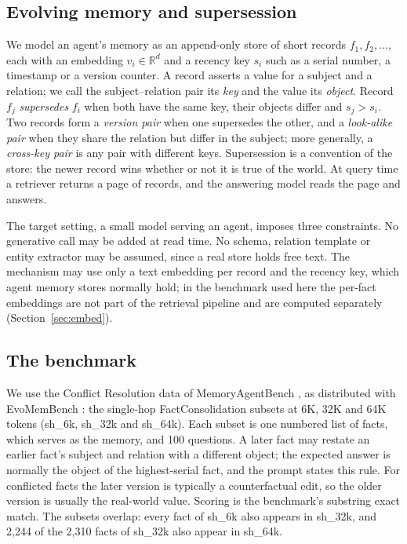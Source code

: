 \documentclass[11pt]{article}
\newcommand{\sub}[1]{\textsf{sh\_#1}}                    %
\begin{document}
\subsection{Evolving memory and supersession}
\label{sec:setting}

We model an agent's memory as an append-only store of short records $f_1,f_2,\dots$, each with an embedding $v_i\in\mathbb{R}^d$ and a recency key $s_i$ such as a serial number, a timestamp or a version counter. A record asserts a value for a subject and a relation; we call the subject--relation pair its \emph{key} and the value its \emph{object}. Record $f_j$ \emph{supersedes} $f_i$ when both have the same key, their objects differ and $s_j>s_i$. Two records form a \emph{version pair} when one supersedes the other, and a \emph{look-alike pair} when they share the relation but differ in the subject; more generally, a \emph{cross-key pair} is any pair with different keys. Supersession is a convention of the store: the newer record wins whether or not it is true of the world. At query time a retriever returns a page of records, and the answering model reads the page and answers.

The target setting, a small model serving an agent, imposes three constraints. No generative call may be added at read time. No schema, relation template or entity extractor may be assumed, since a real store holds free text. The mechanism may use only a text embedding per record and the recency key, which agent memory stores normally hold; in the benchmark used here the per-fact embeddings are not part of the retrieval pipeline and are computed separately (Section~\ref{sec:embed}).

\subsection{The benchmark}
\label{sec:benchmark}

We use the Conflict Resolution data of MemoryAgentBench \cite{hu2026memoryagentbench}, as distributed with EvoMemBench \cite{wang2026evomembench}: the single-hop FactConsolidation subsets at 6K, 32K and 64K tokens (\sub{6k}, \sub{32k} and \sub{64k}). Each subset is one numbered list of facts, which serves as the memory, and 100 questions. A later fact may restate an earlier fact's subject and relation with a different object; the expected answer is normally the object of the highest-serial fact, and the prompt states this rule. For conflicted facts the later version is typically a counterfactual edit, so the older version is usually the real-world value. Scoring is the benchmark's substring exact match. The subsets overlap: every fact of \sub{6k} also appears in \sub{32k}, and 2,244 of the 2,310 facts of \sub{32k} also appear in \sub{64k}.
\end{document}
